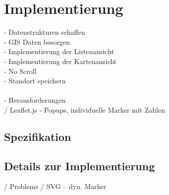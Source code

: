 \documentclass[Bachelorarbeit.tex]{subfiles}
\begin{document}
\chapter{Implementierung}
\label{chap:implementierung}


 - Datenstrukturen schaffen\\
 - GIS Daten besorgen\\
 - Implementierung der Listenansicht\\
 - Implementierung der Kartenansicht\\
 - No Scroll\\
 - Standort speichern\\
 \\
 - Herausforderungen\\
 / Leaflet.js - Popups, individuelle Marker mit Zahlen


\section{Spezifikation}
\label{chap:implementierung:sec:spezifikation}

\section{Details zur Implementierung}
\label{chap:implementierung:sec:details}

/ Probleme
/ SVG -- dyn. Marker
\end{document}
